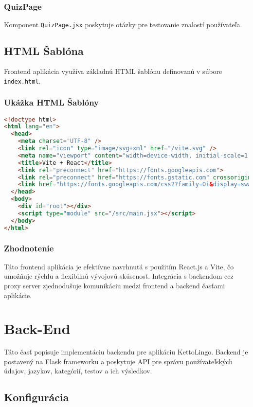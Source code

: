 \documentclass{article}
\begin{document}
\subsubsection{QuizPage}
Komponent \texttt{QuizPage.jsx} poskytuje otázky pre testovanie znalostí používateľa.

\subsection{HTML Šablóna}
Frontend aplikácia využíva základnú HTML šablónu definovanú v súbore \texttt{index.html}.

\subsubsection{Ukážka HTML Šablóny}
\begin{lstlisting}[language=html, caption={HTML Šablóna pre aplikáciu}]
<!doctype html>
<html lang="en">
  <head>
    <meta charset="UTF-8" />
    <link rel="icon" type="image/svg+xml" href="/vite.svg" />
    <meta name="viewport" content="width=device-width, initial-scale=1.0" />
    <title>Vite + React</title>
    <link rel="preconnect" href="https://fonts.googleapis.com">
    <link rel="preconnect" href="https://fonts.gstatic.com" crossorigin>
    <link href="https://fonts.googleapis.com/css2?family=Oi&display=swap" rel="stylesheet">
  </head>
  <body>
    <div id="root"></div>
    <script type="module" src="/src/main.jsx"></script>
  </body>
</html>
\end{lstlisting}

\subsubsection{Zhodnotenie}
Táto frontend aplikácia je efektívne navrhnutá s použitím React.js a Vite, čo umožňuje rýchlu a flexibilnú vývojovú skúsenosť. Integrácia s backendom cez proxy server zjednodušuje komunikáciu medzi frontend a backend časťami aplikácie.


\newpage
\section{Back-End}

Táto časť popisuje implementáciu backendu pre aplikáciu KettoLingo. Backend je postavený na Flask frameworku a poskytuje API pre správu používateľských údajov, jazykov, kategórií, testov a ich výsledkov.

\subsection{Konfigurácia}
\end{document}
